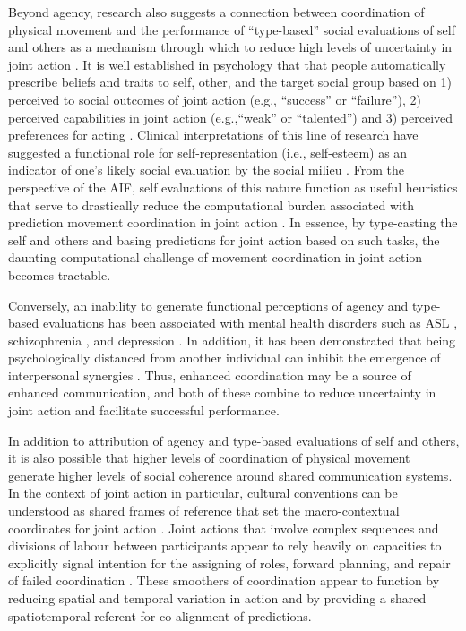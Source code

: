 \begin{CJK}{UTF8}{gbsn}
Beyond agency, research also suggests a connection between coordination of physical movement and the performance of ``type-based'' social evaluations of self and others as a mechanism through which to reduce high levels of uncertainty in joint action \citep{Moutoussis2011,Moutoussis2014}.  It is well established in psychology that that people automatically prescribe beliefs and traits to self, other, and the target social group based on 1) perceived to social outcomes of joint action (e.g., ``success'' or ``failure''), 2) perceived capabilities in joint action (e.g.,``weak'' or ``talented'') and 3) perceived preferences for acting \citep[e.g., ``good,'' ``fair,'' or ``trustworthy'';][]{Bem1967,Fowler2006}.  Clinical interpretations of this line of research have suggested a functional role for self-representation (i.e., self-esteem) as an indicator of one's likely social evaluation by the social milieu \citep{Leary1995}. From the perspective of the AIF, self evaluations of this nature function as useful heuristics that serve to drastically reduce the computational burden associated with prediction movement coordination in joint action \citep{Moutoussis2011}. In essence, by type-casting the self and others and basing predictions for joint action based on such tasks, the daunting computational challenge of movement coordination in joint action becomes tractable.

Conversely, an inability to generate functional perceptions of agency and type-based evaluations has been associated with mental health disorders such as ASL \citep{Friston2015}, schizophrenia \citep{Frith2007}, and depression \citep{Moutoussis2011}.  In addition, it has been demonstrated that being psychologically distanced from another individual can inhibit the emergence of interpersonal synergies \citep{Miles2010}.  Thus, enhanced coordination may be a source of enhanced communication, and both of these combine to reduce uncertainty in joint action and facilitate successful performance.

In addition to attribution of agency and type-based evaluations of self and others, it is also possible that higher levels of coordination of physical movement generate higher levels of social coherence around shared communication systems.  In the context of joint action in particular, cultural conventions can be understood as shared frames of reference that set the macro-contextual coordinates for joint action \citep{Clark2013}.  Joint actions that involve complex sequences and divisions of labour between participants appear to rely heavily on capacities to explicitly signal intention for the assigning of roles, forward planning, and repair of failed coordination \citep{Frith2010}. These smoothers of coordination appear to function by reducing spatial and temporal variation in action and by providing a shared spatiotemporal referent for co-alignment of predictions.


\end{CJK}
